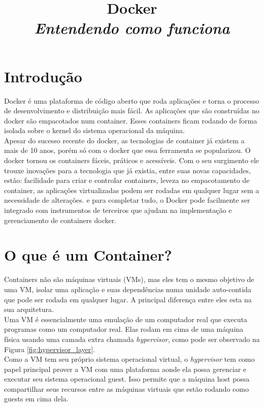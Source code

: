 \documentclass[twocolumn, letterpaper]{scrartcl}
\begin{document}
\title{\color{triton_blue}Docker\\ \textit{Entendendo como funciona}}
\date{}
\maketitle
% 
\section*{\color{triton_blue}Introdução}
Docker é uma plataforma de código aberto que roda aplicações e torna o processo de desenvolvimento e distribuição mais fácil. As aplicações que são construídas no docker são empacotados num container. Esses containers ficam rodando de forma isolada sobre o kernel do sistema operacional da máquina.\\
Apesar do sucesso recente do docker, as tecnologias de container já existem a mais de 10 anos, porém só com o docker que essa ferramenta se popularizou. O docker tornou os containers fáceis, práticos e acessíveis. Com o seu surgimento ele trouxe inovações para a tecnologia que já existia, entre suas novas capacidades, estão: facilidade para criar e controlar containers, leveza no empacotamento de container, as aplicações virtualizadas podem ser rodadas em qualquer lugar sem a necessidade de alterações. e para completar tudo, o Docker pode facilmente ser integrado com instrumentos de terceiros que ajudam na implementação e gerenciamento de containers docker.

\section*{\color{triton_blue}O que é um Container?}
Containers não são máquinas virtuais (VMs), mas eles tem o mesmo objetivo de uma VM, isolar uma aplicação e suas dependências numa unidade auto-contida que pode ser rodada em qualquer lugar. A principal diferença entre eles esta na sua arquitetura.\\
Uma VM é essencialmente uma emulação de um computador real que executa programas como um computador real. Elas rodam em cima de uma máquina física usando uma camada extra chamada \textit{hypervisor}, como pode ser observado na Figura \ref{fig:hypervisor_layer}.\\
Como a VM tem seu próprio sistema operacional virtual, o \textit{hypervisor} tem como papel principal prover a VM com uma plataforma aonde ela possa gerenciar e executar seu sistema operacional guest. Isso permite que a máquina host possa compartilhar seus recursos entre as máquinas virtuais que estão rodando como guests em cima dela.
\end{document}
